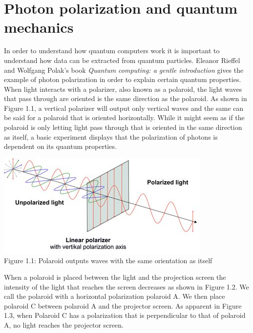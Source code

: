 \documentclass[12pt]{article}   	%
\begin{document}
\section{Photon polarization and quantum mechanics}
In order to understand how quantum computers work it is important to understand how data can be extracted from quantum particles. Eleanor Rieffel and Wolfgang Polak's book \textit{Quantum computing: a gentle introduction} gives the example of photon polarization in order to explain certain quantum properties. When light interacts with a polarizer, also known as a polaroid, the light waves that pass through are oriented is the same direction as the polaroid. As shown in Figure 1.1, a vertical polarizer will output only vertical waves and the same can be said for a polaroid that is oriented horizontally. While it might seem as if the polaroid is only letting light pass through that is oriented in the same direction as itself, a basic experiment displays that the polarization of photons is dependent on its quantum properties.  \\
\begin{center}
    \includegraphics[scale=3]{polaroid2.png}\\
    Figure 1.1: Polaroid outputs waves with the same orientation as itself
\end{center}


When a polaroid is placed between the light and the projection screen the intensity of the light that reaches the screen decreases as shown in Figure 1.2. We call the polaroid with a horizontal polarization polaroid A. We then place polaroid C between polaroid A and the projector screen. As apparent in Figure 1.3, when Polaroid C has a polarization that is perpendicular to that of polaroid A, no light reaches the projector screen.  \\
\end{document}
